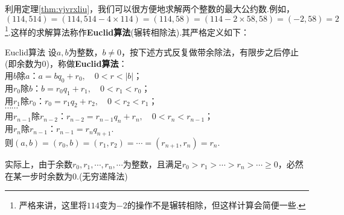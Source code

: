 利用定理\ref{thm:vjvrxliu}，我们可以很方便地求解两个整数的最大公约数.例如，$(114,514)=(114,514-4\times 114) = (114,58) = (114-2\times 58 ,58)=(-2,58)=2$\footnote{严格来讲，这里将$114$变为$-2$的操作不是辗转相除，但这样计算会简便一些.}.这样的求解算法称作\textbf{Euclid算法}(辗转相除法).其严格定义如下：

\begin{theorem}{Euclid算法}
	设$a,b$为整数，$b \neq 0$，按下述方式反复做带余除法，有限步之后停止(即余数为$0$)，称做\textbf{Euclid算法}： \\
	用$b$除$a$：$a=bq_0+r_0,\quad 0<r<|b|$； \\
	用$r_0$除$b$：$b=r_0q_1+r_1,\quad 0<r_1<r_0$； \\
	用$r_1$除$r_0$：$r_0=r_1q_2+r_2,\quad 0<r_2<r_1$； \\
	$\cdots \cdots$ \\
	用$r_{n-1}$除$r_{n-2}$：$r_{n-2}=r_{n-1}q_n+r_n,\quad 0<r_n<r_{n-1}$； \\
	用$r_n$除$r_{n-1}$：$r_{n-1}=r_nq_{n+1}$. \\
	则$(a,b)=(r_0,b)=(r_1,r_2)= \cdots = (r_{n+1},r_n)=r_n$.
\end{theorem}
\begin{remark}
	实际上，由于余数$r_0,r_1,\cdots ,r_n,\cdots $为整数，且满足$r_0 > r_1 > \cdots > r_{n} > \cdots \geq 0$，必然在某一步时余数为$0$.(无穷递降法)
\end{remark}

